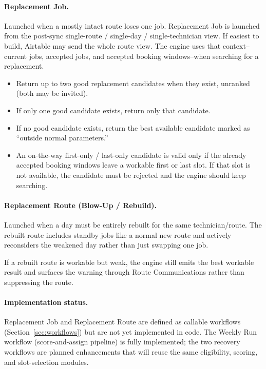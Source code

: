 \documentclass[12pt]{article}
\begin{document}
\paragraph{Replacement Job.}
Launched when a mostly intact route loses one job.
Replacement Job is launched from the post-sync single-route / single-day / single-technician view.
If easiest to build, Airtable may send the whole route view.
The engine uses that context--current jobs, accepted jobs, and accepted booking windows--when searching for a replacement.

\begin{itemize}
    \item Return up to two good replacement candidates when they exist, unranked (both may be invited).
    \item If only one good candidate exists, return only that candidate.
    \item If no good candidate exists, return the best available candidate marked as ``outside normal parameters.''
    \item An on-the-way first-only / last-only candidate is valid only if the already accepted booking windows leave a workable first or last slot.  If that slot is not available, the candidate must be rejected and the engine should keep searching.
\end{itemize}

\paragraph{Replacement Route (Blow-Up / Rebuild).}
Launched when a day must be entirely rebuilt for the same technician/route.
The rebuilt route includes standby jobs like a normal new route and actively reconsiders the weakened day rather than just swapping one job.

If a rebuilt route is workable but weak, the engine still emits the best workable result and surfaces the warning through Route Communications rather than suppressing the route.

\paragraph{Implementation status.}
Replacement Job and Replacement Route are defined as callable workflows (Section~\ref{sec:workflows}) but are not yet implemented in code.
The Weekly Run workflow (score-and-assign pipeline) is fully implemented; the two recovery workflows are planned enhancements that will reuse the same eligibility, scoring, and slot-selection modules.
\end{document}
